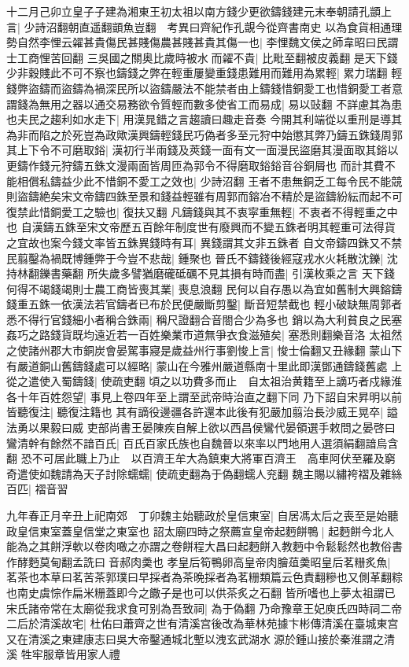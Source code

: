 十二月己卯立皇子子建為湘東王初太祖以南方錢少更欲鑄錢建元末奉朝請孔顗上言|{
	少詩沼翻朝直遥翻顗魚豈翻　考異曰齊紀作孔覬今從齊書南史}
以為食貨相通理勢自然李悝云糴甚貴傷民甚賤傷農甚賤甚貴其傷一也|{
	李悝魏文侯之師韋昭曰民謂士工商悝苦回翻}
三吳國之關奥比歲時被水而糴不貴|{
	比毗至翻被皮義翻}
是天下錢少非穀賤此不可不察也鑄錢之弊在輕重屢變重錢患難用而難用為累輕|{
	累力瑞翻}
輕錢弊盜鑄而盜鑄為禍深民所以盜鑄嚴法不能禁者由上鑄錢惜銅愛工也惜銅愛工者意謂錢為無用之器以通交易務欲令質輕而數多使省工而易成|{
	易以䜴翻}
不詳慮其為患也夫民之趨利如水走下|{
	用漢晁錯之言趨讀曰趣走音奏}
今開其利端從以重刑是導其為非而陷之於死豈為政歟漢興鑄輕錢民巧偽者多至元狩中始懲其弊乃鑄五銖錢周郭其上下令不可磨取鋊|{
	漢初行半兩錢及莢錢一面有文一面漫民盜磨其漫面取其鋊以更鑄作錢元狩鑄五銖文漫兩面皆周匝為郭令不得磨取鋊鋊音谷銅屑也}
而計其費不能相償私鑄益少此不惜銅不愛工之效也|{
	少詩沼翻}
王者不患無銅乏工每令民不能競則盜鑄絶矣宋文帝鑄四銖至景和錢益輕雖有周郭而鎔冶不精於是盜鑄紛紜而起不可復禁此惜銅愛工之驗也|{
	復扶又翻}
凡鑄錢與其不衷寜重無輕|{
	不衷者不得輕重之中也}
自漢鑄五銖至宋文帝歷五百餘年制度世有廢興而不變五銖者明其輕重可法得貨之宜故也案今錢文率皆五銖異錢時有耳|{
	異錢謂其文非五銖者}
自文帝鑄四銖又不禁民翦鑿為禍既博鍾弊于今豈不悲哉|{
	鍾聚也}
晉氏不鑄錢後經寇戎水火耗散沈鑠|{
	沈持林翻鑠書藥翻}
所失歲多譬猶磨礲砥礪不見其損有時而盡|{
	引漢枚乘之言}
天下錢何得不竭錢竭則士農工商皆喪其業|{
	喪息浪翻}
民何以自存愚以為宜如舊制大興鎔鑄錢重五銖一依漢法若官鑄者已布於民便嚴斷剪鑿|{
	斷音短禁截也}
輕小破缺無周郭者悉不得行官錢細小者稱合銖兩|{
	稱尺證翻合音閤合少為多也}
銷以為大利貧良之民塞姦巧之路錢貨既均遠近若一百姓樂業市道無爭衣食滋殖矣|{
	塞悉則翻樂音洛}
太祖然之使諸州郡大市銅炭會晏駕事寢是歲益州行事劉悛上言|{
	悛士倫翻又丑緣翻}
蒙山下有嚴道銅山舊鑄錢處可以經略|{
	蒙山在今雅州嚴道縣南十里此即漢鄧通鑄錢舊處}
上從之遣使入蜀鑄錢|{
	使疏吏翻}
頃之以功費多而止　自太祖治黄籍至上謫巧者戍緣淮各十年百姓怨望|{
	事見上卷四年至上謂至武帝時治直之翻下同}
乃下詔自宋昇明以前皆聽復注|{
	聽復注籍也}
其有謫役邊疆各許還本此後有犯嚴加翦治長沙威王晃卒|{
	謚法勇以果毅曰威}
吏部尚書王晏陳疾自解上欲以西昌侯鸞代晏領選手敕問之晏啓曰鸞清幹有餘然不諳百氏|{
	百氏百家氏族也自魏晉以來率以門地用人選須絹翻諳烏含翻}
恐不可居此職上乃止　以百濟王牟大為鎮東大將軍百濟王　高車阿伏至羅及窮奇遣使如魏請為天子討除蠕蠕|{
	使疏吏翻為于偽翻蠕人兖翻}
魏主賜以繡袴褶及雜絲百匹|{
	褶音習}


九年春正月辛丑上祀南郊　丁卯魏主始聽政於皇信東室|{
	自居馮太后之喪至是始聽政皇信東室蓋皇信堂之東室也}
詔太廟四時之祭薦宣皇帝起麪餅鴨|{
	起麪餅今北人能為之其餅浮軟以卷肉噉之亦謂之卷餅程大昌曰起麪餅入教麪中令鬆鬆然也教俗書作酵麪莫甸翻孟詵曰音郝肉羮也}
孝皇后筍鴨卵高皇帝肉膾葅羮昭皇后茗粣炙魚|{
	茗茶也本草曰茗苦茶郭璞曰早採者為茶晩採者為茗粣類篇云色責翻糝也又側革翻粽也南史虞悰作扁米粣蓋即今之饊子是也可以供茶炙之石翻}
皆所嗜也上夢太祖謂已宋氏諸帝常在太廟從我求食可别為吾致祠|{
	為于偽翻}
乃命豫章王妃庾氏四時祠二帝二后於清溪故宅|{
	杜佑曰蕭齊之世有清溪宫後改為華林苑據卞彬傳清溪在臺城東宫又在清溪之東建康志曰吳大帝鑿通城北塹以洩玄武湖水源於鍾山接於秦淮謂之清溪}
牲牢服章皆用家人禮

